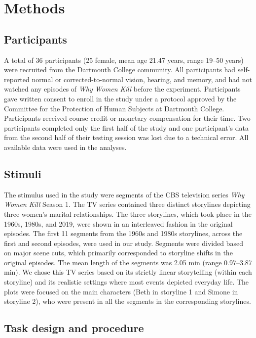 \documentclass[10pt]{article}
\begin{document}
\section*{Methods}
\subsection*{Participants}

A total of 36 participants (25 female, mean age 21.47 years, range 19--50
years) were recruited from the Dartmouth College community. All participants
had self-reported normal or corrected-to-normal vision, hearing, and memory,
and had not watched any episodes of \textit{Why Women Kill} before the
experiment. Participants gave written consent to enroll in the study under a
protocol approved by the Committee for the Protection of Human Subjects at
Dartmouth College. Participants received course credit or monetary compensation
for their time. Two participants completed only the first half of the study and
one participant’s data from the second half of their testing session was lost
due to a technical error. All available data were used in the analyses.

\subsection*{Stimuli}

The stimulus used in the study were segments of the CBS television series
\textit{Why Women Kill} Season 1. The TV series contained three distinct
storylines depicting three women’s marital relationships. The three storylines,
which took place in the 1960s, 1980s, and 2019, were shown in an interleaved
fashion in the original episodes. The first 11 segments from the 1960s and
1980s storylines, across the first and second episodes, were used in our study.
Segments were divided based on major scene cuts, which primarily corresponded
to storyline shifts in the original episodes. The mean length of the segments
was 2.05 min (range 0.97--3.87 min). We chose this TV series based on its
strictly linear storytelling (within each storyline) and its realistic settings
where most events depicted everyday life. The plots were focused on the main
characters (Beth in storyline 1 and Simone in storyline 2), who were present in
all the segments in the corresponding storylines.

\subsection*{Task design and procedure}
\end{document}
